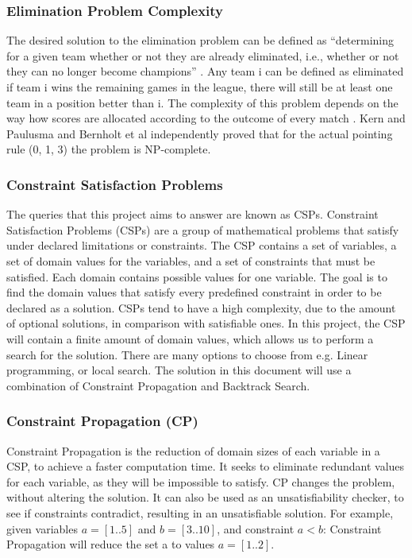 \documentclass{article}
\begin{document}
	
	
	
	\subsubsection{Elimination Problem Complexity}
	The desired solution to the elimination problem can be defined as “determining for a given team whether or not they are already eliminated, i.e., whether or not they can no longer become champions” \cite{threepointrule}. Any team i can be defined as eliminated if team i wins the remaining games in the league, there will still be at least one team in a position better than i. The complexity of this problem depends on the way how scores are allocated according to the outcome of every match \cite{fifarules}. Kern and Paulusma \cite{fifarules} \cite{eliminationproblem} and Bernholt et al\cite{threepointrule} independently proved that for the actual pointing rule (0, 1, 3) the problem
	is NP-complete.
	
	\subsubsection{Constraint Satisfaction Problems}
	The queries that this project aims to answer are known as CSPs. Constraint Satisfaction Problems (CSPs) are a group of mathematical problems that satisfy under declared limitations or constraints. The CSP contains a set of variables, a set of domain values for the variables, and a set of constraints that must be satisfied. Each domain contains possible values for one variable. The goal is to find the domain values that satisfy every predefined constraint in order to be declared as a solution. CSPs tend to have a high complexity, due to the amount of optional solutions, in comparison with satisfiable ones. 
	In this project, the CSP will contain a finite amount of domain values, which allows us to perform a search for the solution. There are many options to choose from e.g. Linear programming, or local search. The solution in this document will use a combination of Constraint Propagation and Backtrack Search.
	
	\subsubsection{Constraint Propagation (CP)}
	Constraint Propagation is the reduction of domain sizes of each variable in a CSP, to achieve a faster computation time. It seeks to eliminate redundant values for each variable, as they will be impossible to satisfy. CP changes the problem, without altering the solution. It can also be used as an unsatisfiability checker, to see if constraints contradict, resulting in an unsatisfiable solution.
	For example, given variables \(a = [1..5]\) and \(b = [3..10]\), and constraint \(a < b\):
	Constraint Propagation will reduce the set a to values \(a = [1..2]\).
	
\end{document}
